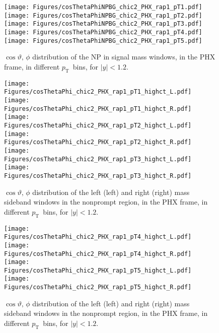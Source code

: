 \documentclass[12pt]{article}
\newcommand{\pt}{$p_{\mathrm{T}}$}
\begin{document}
\begin{figure}[htbp]
\centering
\texttt{[image: Figures/cosThetaPhiNPBG\_chic2\_PHX\_rap1\_pT1.pdf]}
\texttt{[image: Figures/cosThetaPhiNPBG\_chic2\_PHX\_rap1\_pT2.pdf]}
\texttt{[image: Figures/cosThetaPhiNPBG\_chic2\_PHX\_rap1\_pT3.pdf]}
\texttt{[image: Figures/cosThetaPhiNPBG\_chic2\_PHX\_rap1\_pT4.pdf]}
\texttt{[image: Figures/cosThetaPhiNPBG\_chic2\_PHX\_rap1\_pT5.pdf]}
\caption{$\cos\vartheta,\,\phi$ distribution of the NP in signal mass
  windows, in the PHX frame, in different \pt\ bins, for $|y| < 1.2$.}
\end{figure}
\clearpage

\begin{figure}[htbp]
\centering
\texttt{[image: Figures/cosThetaPhi\_chic2\_PHX\_rap1\_pT1\_highct\_L.pdf]}
\texttt{[image: Figures/cosThetaPhi\_chic2\_PHX\_rap1\_pT1\_highct\_R.pdf]}
\texttt{[image: Figures/cosThetaPhi\_chic2\_PHX\_rap1\_pT2\_highct\_L.pdf]}
\texttt{[image: Figures/cosThetaPhi\_chic2\_PHX\_rap1\_pT2\_highct\_R.pdf]}
\texttt{[image: Figures/cosThetaPhi\_chic2\_PHX\_rap1\_pT3\_highct\_L.pdf]}
\texttt{[image: Figures/cosThetaPhi\_chic2\_PHX\_rap1\_pT3\_highct\_R.pdf]}
\caption{$\cos\vartheta,\,\phi$ distribution of the left (left) and
  right (right) mass sideband windows in the nonprompt region, in the PHX frame, in different
  \pt\ bins, for $|y| < 1.2$.}
\end{figure}
\clearpage

\begin{figure}[htbp]
\centering
\texttt{[image: Figures/cosThetaPhi\_chic2\_PHX\_rap1\_pT4\_highct\_L.pdf]}
\texttt{[image: Figures/cosThetaPhi\_chic2\_PHX\_rap1\_pT4\_highct\_R.pdf]}
\texttt{[image: Figures/cosThetaPhi\_chic2\_PHX\_rap1\_pT5\_highct\_L.pdf]}
\texttt{[image: Figures/cosThetaPhi\_chic2\_PHX\_rap1\_pT5\_highct\_R.pdf]}
\caption{$\cos\vartheta,\,\phi$ distribution of the left (left) and
  right (right) mass sideband windows in the nonprompt region, in the PHX frame, in different
  \pt\ bins, for $|y| < 1.2$.}
\end{figure}
\clearpage
\end{document}
